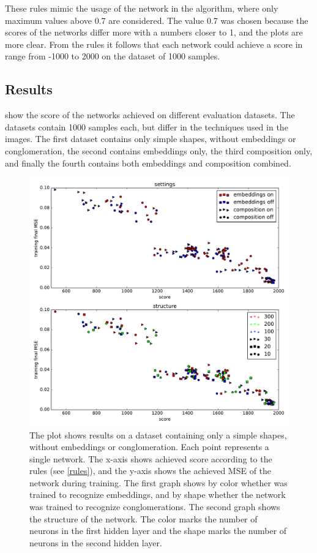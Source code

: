 These rules \label{rules} mimic the usage of the network in the algorithm, where only maximum values above 0.7 are considered. The value 0.7 was chosen because the scores of the networks differ more with a numbers closer to 1, and the plots are more clear. From the rules it follows that each network could achieve a score in range from -1000 to 2000 on the dataset of 1000 samples.

\subsection{Results}
 show the score of the networks achieved on different evaluation datasets. The datasets contain 1000 samples each, but differ in the techniques used in the images. The first dataset contains only simple shapes, without embeddings or conglomeration, the second contains embeddings only, the third composition only, and finally the fourth contains both embeddings and composition combined.

\begin{figure}
\centering
\includegraphics[width=\linewidth]{ext/figure_simples_cmb.pdf}
\caption{The plot shows results on a dataset containing only a simple shapes, without embeddings or conglomeration. Each point represents a single network. The x-axis shows achieved score according to the rules (see \cref{rules}), and the y-axis shows the achieved MSE of the network during training.
The first graph shows by color whether was trained to recognize embeddings, and by shape whether the network was trained to recognize conglomerations.
The second graph shows the structure of the network. The color marks the number of neurons in the first hidden layer and the shape marks the number of neurons in the second hidden layer.}
\label{fig:simples}
\end{figure}

